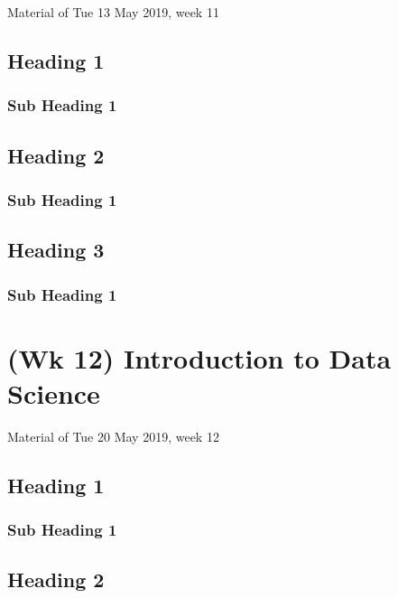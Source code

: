 \documentclass[]{book}
\begin{document}
Material of Tue 13 May 2019, week 11

\section{Heading 1}\label{heading-1-8}

\subsection{Sub Heading 1}\label{sub-heading-1-24}

\section{Heading 2}\label{heading-2-8}

\subsection{Sub Heading 1}\label{sub-heading-1-25}

\section{Heading 3}\label{heading-3-8}

\subsection{Sub Heading 1}\label{sub-heading-1-26}

\chapter{(Wk 12) Introduction to Data
Science}\label{wk-12-introduction-to-data-science}

Material of Tue 20 May 2019, week 12

\section{Heading 1}\label{heading-1-9}

\subsection{Sub Heading 1}\label{sub-heading-1-27}

\section{Heading 2}\label{heading-2-9}
\end{document}
